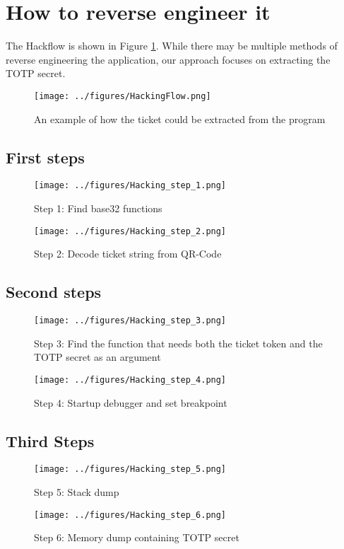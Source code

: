 \section{How to reverse engineer it}
The Hackflow is shown in Figure \ref{fig:HackingFlow}. While there may be multiple methods of reverse engineering the application, our approach focuses on extracting the TOTP secret.

\begin{figure}[h]
    \centering
    \texttt{[image: ../figures/HackingFlow.png]}
    \caption{An example of how the ticket could be extracted from the program}
    \label{fig:HackingFlow}
\end{figure}
\subsection{First steps}

\begin{figure}[h]
    \centering
    \texttt{[image: ../figures/Hacking\_step\_1.png]}
    \caption{Step 1: Find base32 functions}
    \label{fig:HackingStep1}
\end{figure}
\begin{figure}[h]
    \centering
    \texttt{[image: ../figures/Hacking\_step\_2.png]}
    \caption{Step 2: Decode ticket string from QR-Code}
    \label{fig:HackingStep2}
\end{figure}
\subsection{Second steps}

\begin{figure}[h]
    \centering
    \texttt{[image: ../figures/Hacking\_step\_3.png]}
    \caption{Step 3: Find the function that needs both the ticket token and the TOTP secret as an argument}
    \label{fig:HackingStep3}
\end{figure}
\begin{figure}[h]
    \centering
    \texttt{[image: ../figures/Hacking\_step\_4.png]}
    \caption{Step 4: Startup debugger and set breakpoint}
    \label{fig:HackingStep4}
\end{figure}


\subsection{Third Steps}

\begin{figure}[h]
    \centering
    \texttt{[image: ../figures/Hacking\_step\_5.png]}
    \caption{Step 5: Stack dump}
    \label{fig:HackingStep5}
\end{figure}
\begin{figure}[h]
    \centering
    \texttt{[image: ../figures/Hacking\_step\_6.png]}
    \caption{Step 6: Memory dump containing TOTP secret}
    \label{fig:HackingStep6}
\end{figure}
